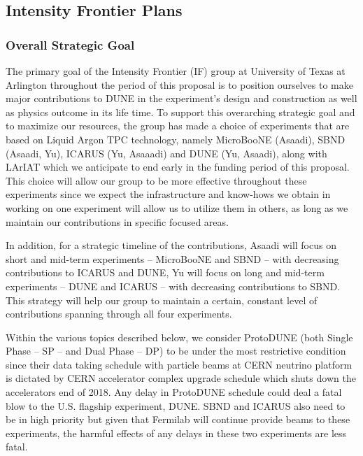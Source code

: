 
\subsection{ Intensity Frontier Plans}
\subsubsection{Overall Strategic Goal}
The primary goal of the Intensity Frontier (IF) group at University of Texas at Arlington throughout the period of this proposal is to position ourselves to make major contributions to DUNE in the experiment’s design and construction as well as physics outcome in its life time.  
To support this overarching strategic goal and to maximize our resources, the group has made a choice of experiments that are based on Liquid Argon TPC technology, namely MicroBooNE (Asaadi), SBND (Asaadi, Yu), ICARUS (Yu, Asaaadi) and DUNE (Yu, Asaadi), along with LArIAT which we anticipate to end early in the funding period of this proposal.   
This choice will allow our group to be more effective throughout these experiments since we expect the infrastructure and know-hows we obtain in working on one experiment will allow us to utilize them in others, as long as we maintain our contributions in specific focused areas.

In addition, for a strategic timeline of the contributions, Asaadi will focus on short and mid-term experiments – MicroBooNE and SBND – with decreasing contributions to ICARUS and DUNE, Yu will focus on long and mid-term experiments – DUNE and ICARUS – with decreasing contributions to SBND.  This strategy will help our group to maintain a certain, constant level of contributions spanning through all four experiments. 

Within the various topics described below, we consider ProtoDUNE (both Single Phase – SP – and Dual Phase – DP) to be under the most restrictive condition since their data taking schedule with particle beams at CERN neutrino platform is dictated by CERN accelerator complex upgrade schedule which shuts down the accelerators end of 2018.   Any delay in ProtoDUNE schedule could deal a fatal blow to the U.S. flagship experiment, DUNE.    SBND and ICARUS also need to be in high priority but given that Fermilab will continue provide beams to these experiments, the harmful effects of any delays in these two experiments are less fatal.

